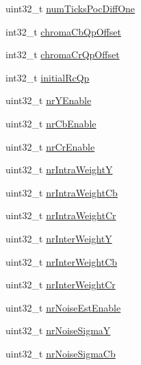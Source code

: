 \begin{DoxyCompactItemize}
\item 
uint32\+\_\+t \mbox{\hyperlink{struct__ni__t408__config__t_a8c4d2f78ba851272fdf16c530678e8e5}{num\+Ticks\+Poc\+Diff\+One}}
\item 
int32\+\_\+t \mbox{\hyperlink{struct__ni__t408__config__t_ad0a3befd3ed0ebb0c7003acaa5492922}{chroma\+Cb\+Qp\+Offset}}
\item 
int32\+\_\+t \mbox{\hyperlink{struct__ni__t408__config__t_ae1c87e6385e22b1c0dce6ecf8449c935}{chroma\+Cr\+Qp\+Offset}}
\item 
int32\+\_\+t \mbox{\hyperlink{struct__ni__t408__config__t_a38585a5241ce4faff11b2536d803258b}{initial\+Rc\+Qp}}
\item 
uint32\+\_\+t \mbox{\hyperlink{struct__ni__t408__config__t_a98953814185368ffca54fd85f3b37c85}{nr\+Y\+Enable}}
\item 
uint32\+\_\+t \mbox{\hyperlink{struct__ni__t408__config__t_a556db0011f8c283748d38093092c1563}{nr\+Cb\+Enable}}
\item 
uint32\+\_\+t \mbox{\hyperlink{struct__ni__t408__config__t_acee109a61abe6ce43c63c7924e42b2da}{nr\+Cr\+Enable}}
\item 
uint32\+\_\+t \mbox{\hyperlink{struct__ni__t408__config__t_ac74e34b49c74dc5c5b039df43a2d6fff}{nr\+Intra\+WeightY}}
\item 
uint32\+\_\+t \mbox{\hyperlink{struct__ni__t408__config__t_aa8a865dc5d4a14ca3ca0dcd73f7b8613}{nr\+Intra\+Weight\+Cb}}
\item 
uint32\+\_\+t \mbox{\hyperlink{struct__ni__t408__config__t_a2d292036b89b683d075e6b729abbc47f}{nr\+Intra\+Weight\+Cr}}
\item 
uint32\+\_\+t \mbox{\hyperlink{struct__ni__t408__config__t_a572ab28c94c7239c17d6ff712f24b892}{nr\+Inter\+WeightY}}
\item 
uint32\+\_\+t \mbox{\hyperlink{struct__ni__t408__config__t_a82fa586ef2b68c8095f8efac3de9980b}{nr\+Inter\+Weight\+Cb}}
\item 
uint32\+\_\+t \mbox{\hyperlink{struct__ni__t408__config__t_a74f5c8aec093eefb24e8c81971f560ab}{nr\+Inter\+Weight\+Cr}}
\item 
uint32\+\_\+t \mbox{\hyperlink{struct__ni__t408__config__t_a7bac97c4d1967ed8c31034e3c402e31f}{nr\+Noise\+Est\+Enable}}
\item 
uint32\+\_\+t \mbox{\hyperlink{struct__ni__t408__config__t_a56f22b5e6fafd5a1e4020b03324ba78d}{nr\+Noise\+SigmaY}}
\item 
uint32\+\_\+t \mbox{\hyperlink{struct__ni__t408__config__t_a551fcc5ea682e36c1fe82833645cbeba}{nr\+Noise\+Sigma\+Cb}}

\end{DoxyCompactItemize}
